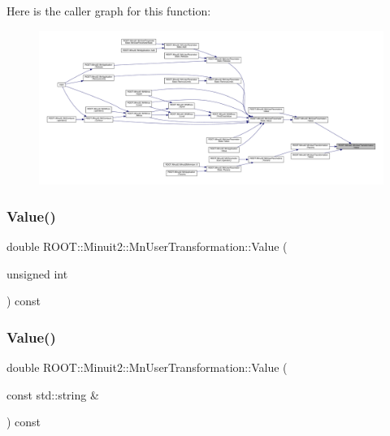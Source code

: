 Here is the caller graph for this function\+:
\nopagebreak
\begin{figure}[H]
\begin{center}
\leavevmode
\includegraphics[width=350pt]{d9/d98/classROOT_1_1Minuit2_1_1MnUserTransformation_a63d57196d60559aa9df6c9c499cd21d0_icgraph}
\end{center}
\end{figure}
\mbox{\label{classROOT_1_1Minuit2_1_1MnUserTransformation_a63d57196d60559aa9df6c9c499cd21d0}} 
\subsubsection{\texorpdfstring{Value()}{Value()}\hspace{0.1cm}{\footnotesize\ttfamily [3/6]}}
{\footnotesize\ttfamily double R\+O\+O\+T\+::\+Minuit2\+::\+Mn\+User\+Transformation\+::\+Value (\begin{DoxyParamCaption}\item[{unsigned int}]{ }\end{DoxyParamCaption}) const}

\mbox{\label{classROOT_1_1Minuit2_1_1MnUserTransformation_a89cf5aca1d345e0d2d069ad6a54ff94d}} 
\subsubsection{\texorpdfstring{Value()}{Value()}\hspace{0.1cm}{\footnotesize\ttfamily [4/6]}}
{\footnotesize\ttfamily double R\+O\+O\+T\+::\+Minuit2\+::\+Mn\+User\+Transformation\+::\+Value (\begin{DoxyParamCaption}\item[{const std\+::string \&}]{ }\end{DoxyParamCaption}) const}

